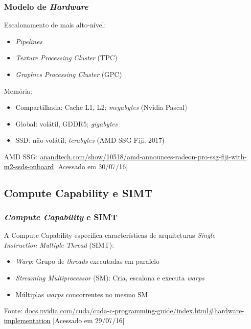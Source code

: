 \documentclass[10pt, compress, aspectratio=43, xcolor={table,usenames,dvipsnames}]{beamer}
\begin{document}
\begin{frame}
    \frametitle{Modelo de \textit{Hardware}}
    Escalonamento de mais alto-nível:
    \begin{itemize}
        \item \textit{Pipelines}
        \item \textit{Texture Processing Cluster} (TPC)
        \item \textit{Graphics Processing Cluster} (GPC)
    \end{itemize}
    Memória:
    \begin{itemize}
        \item Compartilhada: Cache L1, L2; \textit{megabytes} (Nvidia Pascal)
        \item Global: volátil, GDDR5; \textit{gigabytes}
        \item SSD: \alert{não-volátil}; \alert{\textit{terabytes}} (AMD SSG Fiji, 2017)
    \end{itemize}
    \vfill

    \tiny{AMD SSG: \url{anandtech.com/show/10518/amd-announces-radeon-pro-ssg-fiji-with-m2-ssds-onboard} [Acessado em 30/07/16]}
\end{frame}

\subsection{Compute Capability e SIMT}

\begin{frame}
    \frametitle{\textit{Compute Capability} e SIMT}
    A \alert{Compute Capability} especifica características de
    arquiteturas \textit{Single Instruction Multiple Thread} (SIMT):
    \begin{itemize}
        \item \textit{Warp}: Grupo de \textit{threads} executadas em \alert{paralelo}
        \item \textit{Streaming Multiprocessor} (SM): Cria, escalona e executa \textit{warps}
        \item Múltiplas \textit{warps} \alert{concorrentes} no mesmo SM
    \end{itemize}
    \vfill

    \begin{center}
        \tiny{Fonte: \url{docs.nvidia.com/cuda/cuda-c-programming-guide/index.html\#hardware-implementation} [Acessado em 29/07/16]}
    \end{center}
\end{frame}
\end{document}
